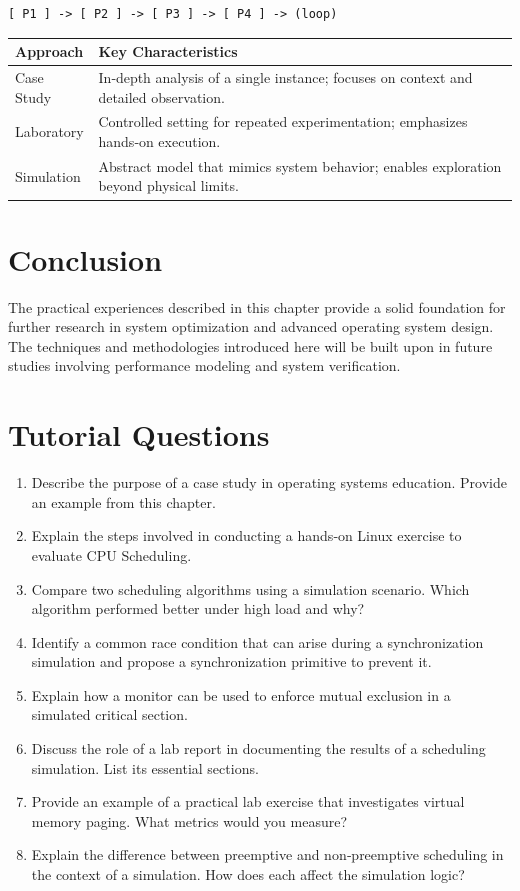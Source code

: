 \documentclass[12pt]{report}
\begin{document}
\begin{verbatim}
[ P1 ] -> [ P2 ] -> [ P3 ] -> [ P4 ] -> (loop)
\end{verbatim}

\begin{table}[ht]
\centering
\begin{tabularx}{\textwidth}{@{} l X @{}}
\toprule
Approach & Key Characteristics \\
\midrule
Case Study & In‑depth analysis of a single instance; focuses on context and detailed observation. \\
Laboratory & Controlled setting for repeated experimentation; emphasizes hands‑on execution. \\
Simulation & Abstract model that mimics system behavior; enables exploration beyond physical limits. \\
\bottomrule
\end{tabularx}
\end{table}

\section{Conclusion}
The practical experiences described in this chapter provide a solid foundation for further research in system optimization and advanced operating system design. The techniques and methodologies introduced here will be built upon in future studies involving performance modeling and system verification.

\section*{Tutorial Questions}
\begin{enumerate}
\item Describe the purpose of a case study in operating systems education. Provide an example from this chapter.
\item Explain the steps involved in conducting a hands‑on Linux exercise to evaluate CPU Scheduling. 
\item Compare two scheduling algorithms using a simulation scenario. Which algorithm performed better under high load and why? 
\item Identify a common race condition that can arise during a synchronization simulation and propose a synchronization primitive to prevent it. 
\item Explain how a monitor can be used to enforce mutual exclusion in a simulated critical section. 
\item Discuss the role of a lab report in documenting the results of a scheduling simulation. List its essential sections. 
\item Provide an example of a practical lab exercise that investigates virtual memory paging. What metrics would you measure? 
\item Explain the difference between preemptive and non‑preemptive scheduling in the context of a simulation. How does each affect the simulation logic? 
\end{enumerate}
\end{document}
